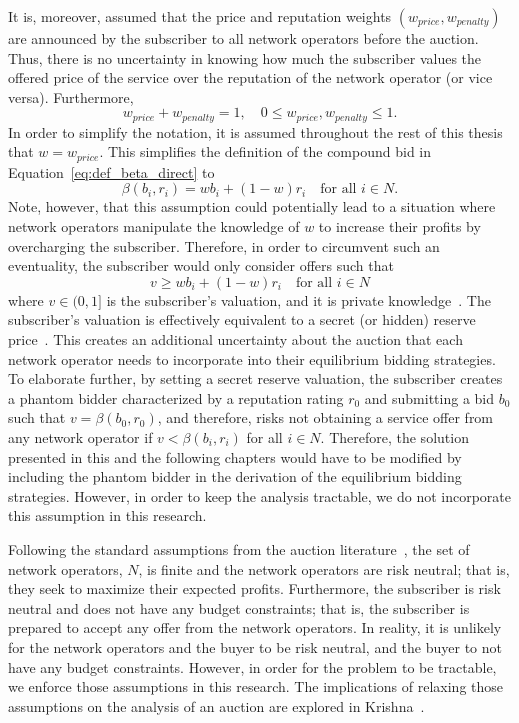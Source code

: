 It is, moreover, assumed that the price and reputation weights $(w_{price}, w_{penalty})$ are announced by the subscriber to all network operators before the auction. Thus, there is no uncertainty in knowing how much the subscriber values the offered price of the service over the reputation of the network operator (or vice versa). Furthermore,
\begin{equation*}
	w_{price} + w_{penalty} = 1,\quad 0\le w_{price},w_{penalty} \le 1.
\end{equation*}
In order to simplify the notation, it is assumed throughout the rest of this thesis that $w=w_{price}$. This simplifies the definition of the compound bid in Equation~\eqref{eq:def_beta_direct} to
\begin{equation*}
  \beta(b_i, r_i) = wb_i + (1-w)r_i\quad\text{for all } i\in N.
\end{equation*}
Note, however, that this assumption could potentially lead to a situation where network operators manipulate the knowledge of $w$ to increase their profits by overcharging the subscriber. Therefore, in order to circumvent such an eventuality, the subscriber would only consider offers such that
\begin{equation}
	\label{eq:subscribers_valuation_direct}
	v\geq wb_i + (1-w)r_i \quad\text{for all } i\in N
\end{equation}
where $v\in (0,1]$ is the subscriber's valuation, and it is private knowledge~\cite{DMLeBodic00}. The subscriber's valuation is effectively equivalent to a secret (or hidden) reserve price~\cite{Vincent1995575,LiPerrigne1999,BajariHortacsu2003}. This creates an additional uncertainty about the auction that each network operator needs to incorporate into their equilibrium bidding strategies. To elaborate further, by setting a secret reserve valuation, the subscriber creates a phantom bidder characterized by a reputation rating $r_0$ and submitting a bid $b_0$ such that $v=\beta(b_0,r_0)$, and therefore, risks not obtaining a service offer from any network operator if $v < \beta(b_i,r_i)$ for all $i\in N$. Therefore, the solution presented in this and the following chapters would have to be modified by including the phantom bidder in the derivation of the equilibrium bidding strategies. However, in order to keep the analysis tractable, we do not incorporate this assumption in this research.
	
Following the standard assumptions from the auction literature~\cite{Krishna10}, the set of network operators, $N$, is finite and the network operators are risk neutral; that is, they seek to maximize their expected profits. Furthermore, the subscriber is risk neutral and does not have any budget constraints; that is, the subscriber is prepared to accept any offer from the network operators. In reality, it is unlikely for the network operators and the buyer to be risk neutral, and the buyer to not have any budget constraints. However, in order for the problem to be tractable, we enforce those assumptions in this research. The implications of relaxing those assumptions on the analysis of an auction are explored in Krishna~\cite{Krishna10}.

